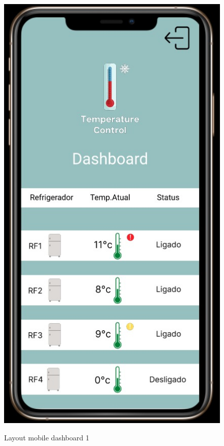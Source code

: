     \begin{figure}[ht]
        \caption{Layout mobile dashboard 1}
        \centering
        \includegraphics[scale=0.5]{img/mobile/dashboard_1.jpeg}
        \label{fig:mobileDashboard1}
    \end{figure}

